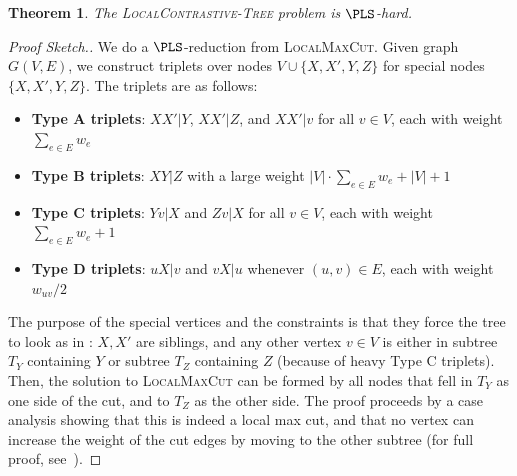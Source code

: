 \documentclass{article}
\theoremstyle{definition}  %
\theoremstyle{plain}
\newtheorem{theorem}{Theorem}
\numberwithin{observation}{section}
\numberwithin{claim}{section}
\numberwithin{fact}{section}
\numberwithin{lemma}{section}
\numberwithin{proposition}{section}
\numberwithin{theorem}{section}
\numberwithin{corollary}{section}
\numberwithin{definition}{section}
\theoremstyle{plain}
\begin{document}
\begin{theorem}\label{thm:local-contrastive-tree}
The \textsc{LocalContrastive-Tree} problem is $\PLS$-hard.
\end{theorem}
\vspace{-0.2cm}
\begin{proof}[Proof Sketch.]
    
We do a $\PLS$-reduction from \textsc{LocalMaxCut}. Given graph $G(V, E)$, we construct triplets over nodes $V\cup \{X, X', Y, Z\}$ for special nodes $\{X, X', Y, Z\}$. The triplets are as follows:
    \begin{itemize}
    \vspace{-0.2cm}
        \item \textbf{Type A triplets}: $XX'|Y$, $XX'|Z$, and $XX'|v$ for all $v \in V$, each with weight $\sum_{e \in E}w_e$
        \vspace{-0.2cm}
        \item \textbf{Type B triplets}: $XY|Z$ with a large weight $|V| \cdot \sum_{e \in E}w_e + |V| + 1$
        \vspace{-0.2cm}
        \item \textbf{Type C triplets}: $Yv|X$ and $Zv|X$ for all $v \in V$, each with weight $\sum_{e \in E}w_e + 1$
        \vspace{-0.2cm}
        \item \textbf{Type D triplets}: $uX|v$ and $vX|u$ whenever $(u, v) \in E$, each with weight $w_{uv}/2$
        \vspace{-0.2cm}
    \end{itemize}
    The purpose of the special vertices and the constraints is that they force the tree to look as in : $X,X'$ are siblings, and any other vertex $v\in V$ is either in subtree $T_Y$ containing $Y$ or subtree $T_Z$ containing $Z$ (because of heavy Type C triplets). Then, the solution to \textsc{LocalMaxCut} can be formed by all nodes that fell in $T_Y$ as one side of the cut, and to $T_Z$ as the other side. The proof proceeds by a case analysis showing that this is indeed a local max cut, and that no vertex can increase the weight of the cut edges by moving to the other subtree (for full proof, see~).
    \end{proof}
\end{document}

